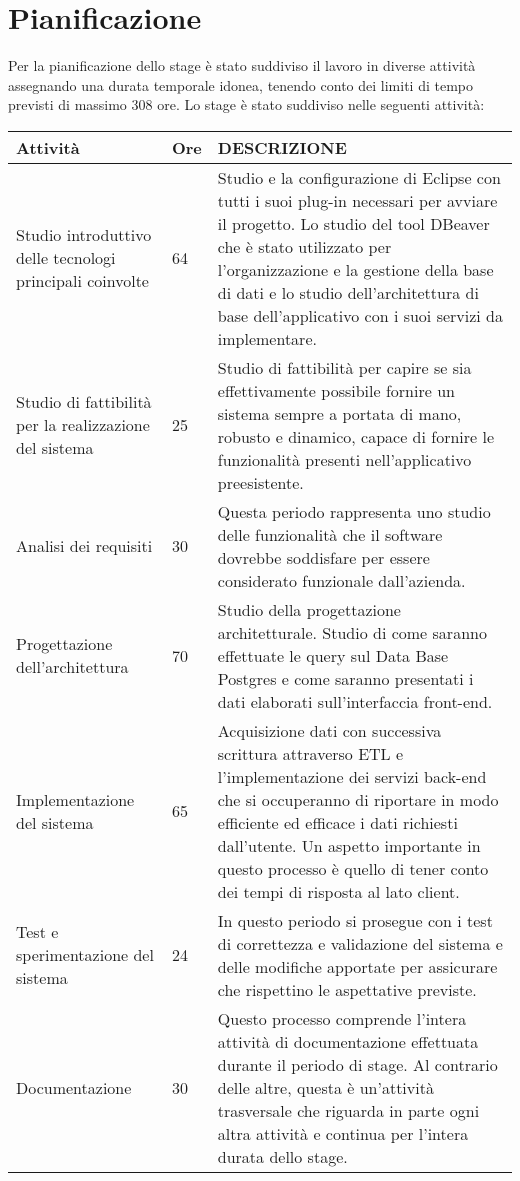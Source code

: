 \begin{table}
\section{Pianificazione}

Per la pianificazione dello stage è stato suddiviso il lavoro in diverse attività assegnando una durata temporale idonea, tenendo conto dei limiti di tempo previsti di massimo 308 ore. Lo stage è stato suddiviso nelle seguenti attività: \\

\begin{tabular}{ |p{3cm}|p{1cm}|p{8cm}| }

 \hline
\textbf{Attività}   &  \textbf{Ore}    &  \textbf{DESCRIZIONE} \\ 

 \hline
  Studio introduttivo delle tecnologi principali coinvolte &  64 & Studio e la configurazione di Eclipse con tutti i suoi \gls{plug-in} necessari per avviare il progetto. Lo studio del tool DBeaver che è stato utilizzato per l'organizzazione e la gestione della base di dati e lo studio dell'architettura di base dell'applicativo con i suoi servizi da implementare.\\
 \hline
Studio di fattibilità per la realizzazione del sistema &   25  & Studio di fattibilità per capire se sia effettivamente possibile fornire un sistema sempre a portata di mano, robusto e dinamico, capace di fornire le funzionalità  presenti nell'applicativo preesistente. \\
 \hline
 Analisi dei requisiti &   30  & Questa periodo rappresenta uno studio delle funzionalità che il software dovrebbe soddisfare per essere considerato funzionale dall'azienda. \\
 \hline
  Progettazione dell'architettura &   70  & Studio della progettazione architetturale. Studio di come saranno effettuate le query sul Data Base Postgres e come saranno presentati i dati elaborati sull'interfaccia front-end.  \\
 \hline
   Implementazione del sistema &   65  & Acquisizione dati con successiva scrittura attraverso ETL e l'implementazione dei servizi back-end che si occuperanno di riportare in modo efficiente ed efficace i dati richiesti dall'utente. Un aspetto importante in questo processo è quello di tener conto dei tempi di risposta al lato client.  \\
 \hline
   Test e sperimentazione del sistema &   24  & In questo periodo si prosegue con i test di correttezza e validazione del sistema e delle modifiche apportate per assicurare che rispettino le aspettative previste.  \\
 \hline
    Documentazione&   30  & Questo  processo comprende l'intera attività di documentazione effettuata durante il periodo di stage. Al contrario delle altre, questa è un'attività trasversale che riguarda in parte ogni altra attività e continua per l'intera durata dello stage.  \\
 \hline


\end{tabular}
\end{table}
